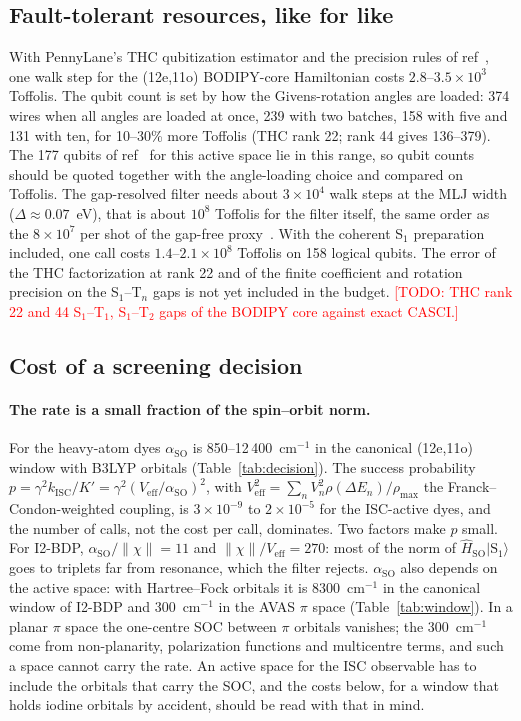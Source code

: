 \documentclass[journal=jctcce,manuscript=article,layout=twocolumn]{achemso}
\newcommand{\todo}[1]{\textcolor{red}{[TODO: #1]}}
\newcommand{\kisc}{k_\mathrm{ISC}}
\newcommand{\Hso}{\hat H_\mathrm{SO}}
\newcommand{\aso}{\alpha_\mathrm{SO}}
\begin{document}
\subsection{Fault-tolerant resources, like for like}
\label{sec:resources}

With PennyLane's THC qubitization estimator and the precision rules of ref~, one
walk step for the (12e,11o) BODIPY-core Hamiltonian costs $2.8$--$3.5\times10^{3}$ Toffolis. The qubit
count is set by how the Givens-rotation angles are loaded: 374 wires when all angles are loaded at once,
239 with two batches, 158 with five and 131 with ten, for 10--30\% more Toffolis (THC rank 22; rank 44
gives 136--379). The 177 qubits of ref~ for this active space lie in this range, so
qubit counts should be quoted together with the angle-loading choice and compared on Toffolis. The
gap-resolved filter needs about $3\times10^{4}$ walk steps at the MLJ width
($\Delta\approx0.07$~eV), that is about $10^{8}$ Toffolis for the filter itself, the same order as the
$8\times10^{7}$ per shot of the gap-free proxy~\cite{Zhou2026PRA}. With the coherent S$_1$ preparation
included, one call costs $1.4$--$2.1\times10^{8}$ Toffolis on 158 logical qubits. The error of the THC
factorization at rank 22 and of the finite coefficient and rotation precision on the S$_1$--T$_n$ gaps
is not yet included in the budget. \todo{THC rank 22 and 44 S$_1$--T$_1$, S$_1$--T$_2$ gaps of the
BODIPY core against exact CASCI.}

\subsection{Cost of a screening decision}
\label{sec:decision}

\paragraph{The rate is a small fraction of the spin--orbit norm.} For the heavy-atom dyes $\aso$ is
850--12\,400~cm$^{-1}$ in the canonical (12e,11o) window with B3LYP orbitals (Table~\ref{tab:decision}). The
success probability $p=\gamma^2\kisc/K'=\gamma^2(V_\mathrm{eff}/\aso)^2$, with
$V_\mathrm{eff}^2=\sum_nV_n^2\rho(\Delta E_n)/\rho_\mathrm{max}$ the Franck--Condon-weighted coupling, is
$3\times10^{-9}$ to $2\times10^{-5}$ for the ISC-active dyes, and the number of calls, not the cost per call,
dominates. Two factors make $p$ small. For I2-BDP, $\aso/\lVert\chi\rVert=11$ and $\lVert\chi\rVert/V_\mathrm{eff}=270$:
most of the norm of $\Hso\lvert\mathrm{S}_1\rangle$ goes to triplets far from resonance, which the filter
rejects. $\aso$ also depends on the active space: with Hartree--Fock orbitals it is 8300~cm$^{-1}$ in the
canonical window of I2-BDP and 300~cm$^{-1}$ in the AVAS $\pi$ space (Table~\ref{tab:window}). In a planar
$\pi$ space the one-centre SOC between $\pi$ orbitals vanishes; the 300~cm$^{-1}$ come from non-planarity,
polarization functions and multicentre terms, and such a space cannot carry the rate. An active space for the
ISC observable has to include the orbitals that carry the SOC, and the costs below, for a window that holds
iodine orbitals by accident, should be read with that in mind.
\end{document}
